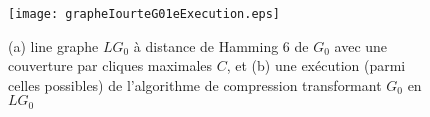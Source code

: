 \begin{centering} \vspace{-0.5em}
\begin{figure}[htb!] \vspace{-0.5em}
\texttt{[image: grapheIourteG01eExecution.eps]}
\caption{ (a) line graphe $LG_0$ \`a distance de Hamming $6$ de $G_0$ avec une couverture par cliques maximales $C$, et (b) une ex\'ecution (parmi celles possibles) de l'algorithme de compression transformant $G_0$ en $LG_0$}
\label{graphe_iourte_G0_une_execution} 
\end{figure}
\end{centering} 


